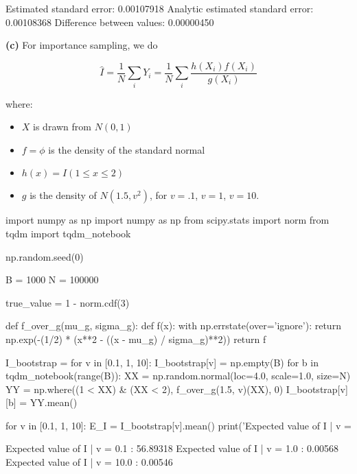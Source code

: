 \begin{console}
Estimated standard error:                0.00107918
Analytic estimated standard error:       0.00108368
Difference between values:               0.00000450
    \end{console}

\textbf{(c)} For importance sampling, we do

\[ \hat{I} = \frac{1}{N} \sum_i Y_i = \frac{1}{N} \sum_i \frac{h(X_i) f(X_i)}{g(X_i)} \]

where:

\begin{itemize}[tightlist]
\item
  \(X\) is drawn from \(N(0, 1)\)
\item
  \(f = \phi\) is the density of the standard normal
\item
  \(h(x) = I(1 \leq x \leq 2)\)
\item
  \(g\) is the density of \(N(1.5, v^2)\), for \(v = .1\), \(v = 1\),
  \(v = 10\).
\end{itemize}

\begin{python}
import numpy as np
import numpy as np
from scipy.stats import norm
from tqdm import tqdm_notebook

np.random.seed(0)

B = 1000
N = 100000

true_value = 1 - norm.cdf(3)

def f_over_g(mu_g, sigma_g):
    def f(x):
        with np.errstate(over='ignore'):
            return np.exp(-(1/2) * (x**2 - ((x - mu_g) / sigma_g)**2))
    return f

I_bootstrap = {}
for v in [0.1, 1, 10]:    
    I_bootstrap[v] = np.empty(B)
    for b in tqdm_notebook(range(B)):
        XX = np.random.normal(loc=4.0, scale=1.0, size=N)
        YY = np.where((1 < XX) & (XX < 2), f_over_g(1.5, v)(XX), 0)
        I_bootstrap[v][b] = YY.mean()
\end{python}

\begin{python}
for v in [0.1, 1, 10]:
    E_I = I_bootstrap[v].mean()
    print('Expected value of I | v = %
\end{python}

\begin{console}
Expected value of I | v = 0.1 :          56.89318
Expected value of I | v = 1.0 :          0.00568
Expected value of I | v = 10.0 :         0.00546
\end{console}

